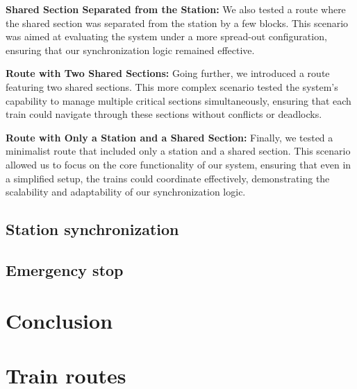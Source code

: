 \documentclass{article}
\begin{document}
    \textbf{Shared Section Separated from the Station:} We also tested a route where the shared section was separated from the station by a few blocks. This scenario was aimed at evaluating the system under a more spread-out configuration, ensuring that our synchronization logic remained effective.

    \textbf{Route with Two Shared Sections:} Going further, we introduced a route featuring two shared sections. This more complex scenario tested the system's capability to manage multiple critical sections simultaneously, ensuring that each train could navigate through these sections without conflicts or deadlocks.

    \textbf{Route with Only a Station and a Shared Section:} Finally, we tested a minimalist route that included only a station and a shared section. This scenario allowed us to focus on the core functionality of our system, ensuring that even in a simplified setup, the trains could coordinate effectively, demonstrating the scalability and adaptability of our synchronization logic.


    \subsection*{Station synchronization}

    \subsection*{Emergency stop}

    \section{Conclusion}

    \appendix

    \section{Train routes}
\end{document}
